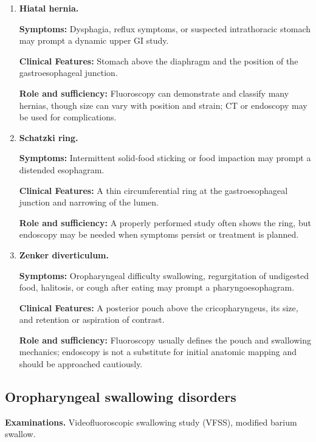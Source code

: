 \begin{enumerate}[leftmargin=*,itemsep=0.45em,topsep=0.4em]
\item \textbf{Hiatal hernia.}\par\noindent\textbf{Symptoms:} Dysphagia, reflux symptoms, or suspected intrathoracic stomach may prompt a dynamic upper GI study.\par\noindent\textbf{Clinical Features:} Stomach above the diaphragm and the position of the gastroesophageal junction.\par\noindent\textbf{Role and sufficiency:} Fluoroscopy can demonstrate and classify many hernias, though size can vary with position and strain; CT or endoscopy may be used for complications.
\item \textbf{Schatzki ring.}\par\noindent\textbf{Symptoms:} Intermittent solid-food sticking or food impaction may prompt a distended esophagram.\par\noindent\textbf{Clinical Features:} A thin circumferential ring at the gastroesophageal junction and narrowing of the lumen.\par\noindent\textbf{Role and sufficiency:} A properly performed study often shows the ring, but endoscopy may be needed when symptoms persist or treatment is planned.
\item \textbf{Zenker diverticulum.}\par\noindent\textbf{Symptoms:} Oropharyngeal difficulty swallowing, regurgitation of undigested food, halitosis, or cough after eating may prompt a pharyngoesophagram.\par\noindent\textbf{Clinical Features:} A posterior pouch above the cricopharyngeus, its size, and retention or aspiration of contrast.\par\noindent\textbf{Role and sufficiency:} Fluoroscopy usually defines the pouch and swallowing mechanics; endoscopy is not a substitute for initial anatomic mapping and should be approached cautiously.
\end{enumerate}

\subsection{Oropharyngeal swallowing disorders}
\textbf{Examinations.} Videofluoroscopic swallowing study (VFSS), modified barium swallow.

